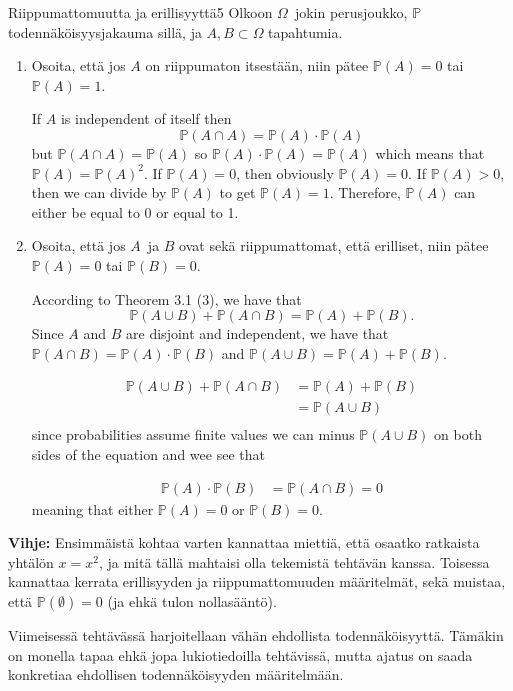 \documentclass[11pt,a4paper]{amsart}
\newcommand{\1}{\mathbf{1}}
\renewcommand{\P}{\mathbb P}
\begin{document}
\begin{Exercises}{Riippumattomuutta ja erillisyyttä}{5}
Olkoon $\Omega$ jokin perusjoukko, $\mathbb P$ todennäköisyysjakauma sillä, ja $A,B\subset \Omega$ tapahtumia. 
\begin{enumerate}
\item Osoita, että jos $A$ on riippumaton itsestään, niin pätee $\P(A)=0$ tai $\P(A)=1$.

    If $ A$ is independent of itself then
    \[
        \P(A \cap A) = \P(A) \cdot \P(A)
    \] 
    but $ \P(A \cap A) = \P(A)$ so $ \P(A) \cdot \P(A) = \P(A) $ which means 
    that $ \P(A) = \P(A)^2$. If $ \P(A) = 0$, then obviously $ \P(A) = 0$. If $ \P(A) > 0$, then
    we can divide by $ \P(A) $ to get $ \P(A) = 1$. Therefore, $ \P(A) $ can either be equal to 0 or
    equal to 1.
\item Osoita, että jos $A$ ja $B$ ovat sekä riippumattomat, että erilliset, niin pätee $\P(A)=0$ tai $\P(B)=0$.

    According to Theorem 3.1 (3), we have that 
    \[
        \P(A \cup B) + \P(A\cap B) = \P(A) + \P(B)
    .\] 
    Since $ A$ and $ B$ are disjoint and independent, we have that 
    $ \P(A \cap B) = \P(A) \cdot \P(B)$ and $ \P(A \cup B) = \P(A) + \P(B)$.

    \begin{align*}
	\P(A \cup B) + \P(A\cap B) &= \P(A) + \P(B)\\
				   &= \P(A \cup B) \\
    \end{align*}
    since probabilities assume finite values we can minus $ \P(A \cup B)$ on both sides of the
    equation and wee see that 

    \begin{align*}
	\P(A) \cdot \P(B) &= \P(A \cap B) = 0
    \end{align*}
    meaning that either $ \P(A) = 0$ or $ \P(B)= 0$.
\end{enumerate}
{\bf Vihje:}  Ensimmäistä kohtaa varten kannattaa miettiä, että osaatko ratkaista yhtälön $x=x^2$, ja mitä tällä mahtaisi olla tekemistä tehtävän kanssa. Toisessa kannattaa kerrata erillisyyden ja riippumattomuuden määritelmät, sekä muistaa, että $\P(\emptyset)=0$ (ja ehkä tulon nollasääntö).
\end{Exercises}


Viimeisessä tehtävässä harjoitellaan vähän ehdollista todennäköisyyttä. Tämäkin on monella tapaa ehkä jopa lukiotiedoilla tehtävissä, mutta ajatus on saada konkretiaa ehdollisen todennäköisyyden määritelmään.
\end{document}
